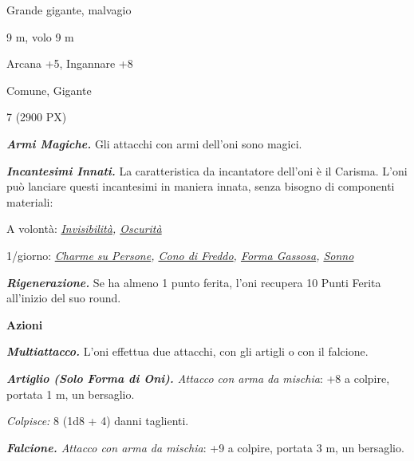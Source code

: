 \begin{multicols}{2}
{
\begin{description}[noitemsep, topsep=0pt, parsep=0pt, partopsep=0pt, itemsep=1pt, leftmargin=2.35cm,  labelwidth=2.2cm, itemindent=0cm, listparindent=0pt] %
\setlength{\baselineskip}{10pt}
\item[\textbf{Taglia/Tipo}] Grande gigante, malvagio
\item[\textbf{Caratt.}] 
\item[\textbf{Punti Ferita}] 
\item[\textbf{Movimento}] 9 m, volo 9 m
\item[\textbf{Tiri Salvez.}] 
\item[\textbf{Comp.}] Arcana +5, Ingannare +8
\item[\textbf{Sensi}] 
\item[\textbf{Linguaggi}] Comune, Gigante
\item[\textbf{Sfida}] 7 (2900 PX)
\end{description}
\smallskip

\emph{\textbf{Armi Magiche.}} Gli attacchi con armi dell'oni sono magici.

\emph{\textbf{Incantesimi Innati.}} La caratteristica da incantatore dell'oni è il Carisma. L'oni può lanciare questi incantesimi in maniera innata, senza bisogno di componenti materiali:

A volontà: \emph{\hyperlink{Invisibilità}{Invisibilità}, \hyperlink{Oscurità}{Oscurità}}

1/giorno: \emph{\hyperlink{Charme su Persone}{Charme su Persone}, \hyperlink{Cono di Freddo}{Cono di Freddo}, \hyperlink{Forma Gassosa}{Forma Gassosa}, \hyperlink{Sonno}{Sonno}}

\emph{\textbf{Rigenerazione.}} Se ha almeno 1 punto ferita, l'oni recupera 10 Punti Ferita all'inizio del suo round.

\textbf{Azioni}

\emph{\textbf{Multiattacco.}} L'oni effettua due attacchi, con gli artigli o con il falcione.

\emph{\textbf{Artiglio (Solo Forma di Oni).} Attacco con arma da mischia}: +8 a colpire, portata 1 m, un bersaglio.

\emph{Colpisce:} 8 (1d8 + 4) danni taglienti.

\emph{\textbf{Falcione.} Attacco con arma da mischia}: +9 a colpire, portata 3 m, un bersaglio.

}
\end{multicols}
